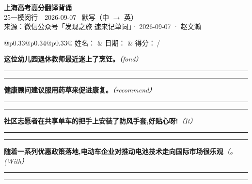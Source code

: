 \documentclass[11pt,a4paper]{article}
\newcommand{\num}[1]{\makebox[1.9em][r]{#1.}\hspace{0.3em}}
\newcommand{\wline}{\noindent\rule{\linewidth}{0.4pt}}
\newcommand{\prompt}[1]{\emph{\textcolor{tipblue}{\small（#1）}}}
\begin{document}
\pagestyle{plain}
\begin{center}
{\LARGE\bfseries 上海高考高分翻译背诵 }\\[0.25em]
{\large 25一模闵行　2026-09-07 \quad\ 默写（中 $\to$ 英）}\\[0.35em]
{\footnotesize 来源：微信公众号「发现之旅 速来记单词」· 2026-09-07 · 赵文瀚}
\end{center}

\vspace{0.4em}
\noindent\begin{tabular}{@{}p{0.33\textwidth}@{}p{0.34\textwidth}@{}p{0.33\textwidth}@{}}
姓名：\underline{\hspace{2.0cm}} & 日期：\underline{\hspace{2.0cm}} & 得分：\underline{\hspace{1.4cm}}\,/ \\
\end{tabular}

\vspace{0.5em}

\vspace{0.8em}
\num{1}\textbf{这位幼儿园退休教师最近迷上了烹饪。}\prompt{fond}

\vspace{0.3em}

\wline\vspace{0.3em}
\wline

\num{2}\textbf{健康顾问建议服用药草来促进康复。}\prompt{recommend}

\vspace{0.3em}

\wline\vspace{0.3em}
\wline

\num{3}\textbf{社区志愿者在共享单车的把手上安装了防风手套,好贴心呀!}\prompt{It}

\vspace{0.3em}

\wline\vspace{0.3em}
\wline

\num{4}\textbf{随着一系列优惠政策落地,电动车企业对推动电池技术走向国际市场很乐观}\prompt{。(With}

\vspace{0.3em}

\wline\vspace{0.3em}
\wline
\end{document}
